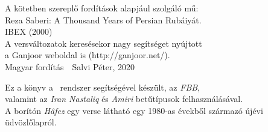 \thispagestyle{empty}
\begin{center}
  A kötetben szereplő fordítások alapjául szolgáló mű:\\
  \bigskip
  Reza Saberi: A Thousand Years of Persian Rubáiyát.\\
  IBEX (2000)\\
  \bigskip
  A versváltozatok keresésekor nagy segítséget nyújtott\\
  a Ganjoor weboldal is (http://ganjoor.net/).\\
  \bigskip
  Magyar fordítás\ \textcopyright\ Salvi Péter, 2020
\end{center}
\vspace*{\fill}
{\small Ez a könyv a \XeLaTeX\ rendszer segítségével készült, az \emph{FBB},\\
  valamint az \emph{Iran Nastaliq} és \emph{Amiri} betűtípusok felhasználásával.\\
  A borítón \emph{Hâfez} egy verse látható egy 1980-as évekből származó újévi üdvözlőlapról.
}

